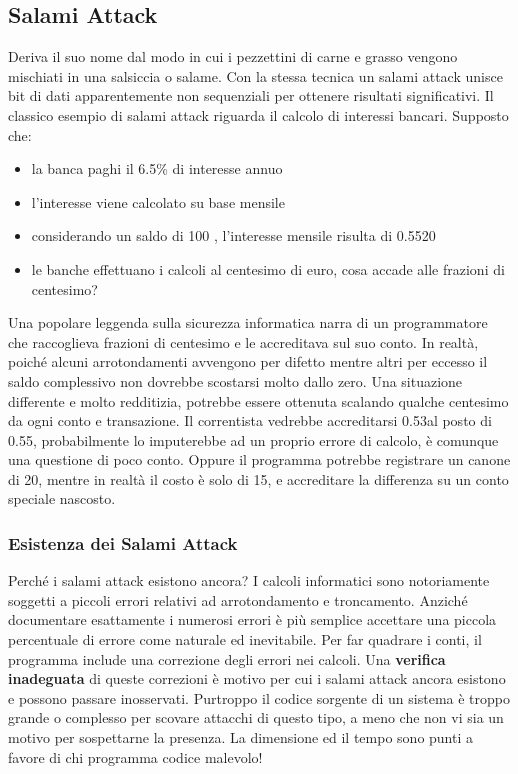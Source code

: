 \subsection{Salami Attack}
Deriva il suo nome dal modo in cui i pezzettini di carne e grasso vengono mischiati in una salsiccia o salame. Con la stessa tecnica un salami attack unisce bit di dati apparentemente non sequenziali per ottenere risultati significativi.
Il classico esempio di salami attack riguarda il calcolo di interessi bancari. Supposto che:
\begin{itemize}
	\item la banca paghi il 6.5\% di interesse annuo
	\item l'interesse viene calcolato su base mensile
	\item considerando un saldo di 100 \officialeuro, l'interesse mensile risulta di 0.5520 \officialeuro
	\item le banche effettuano i calcoli al centesimo di euro, cosa accade alle frazioni di centesimo?
\end{itemize}
Una popolare leggenda sulla sicurezza informatica narra di un programmatore che raccoglieva frazioni di centesimo e le accreditava sul suo conto.
In realtà, poiché alcuni arrotondamenti avvengono per difetto mentre altri per eccesso il saldo complessivo non dovrebbe scostarsi molto dallo zero.
\newline
Una situazione differente e molto redditizia, potrebbe essere ottenuta scalando qualche centesimo da ogni conto e transazione. Il correntista vedrebbe accreditarsi 0.53\officialeuro al posto di 0.55\officialeuro, probabilmente lo imputerebbe ad un proprio errore di calcolo, è comunque una questione di poco conto.
Oppure il programma potrebbe registrare un canone di 20\officialeuro, mentre in realtà il costo è solo di 15\officialeuro, e accreditare la differenza su un conto speciale nascosto.
\subsubsection{Esistenza dei Salami Attack}
Perché i salami attack esistono ancora? I calcoli informatici sono notoriamente soggetti a piccoli errori relativi ad arrotondamento e troncamento. Anziché documentare esattamente i numerosi errori è più semplice accettare una piccola percentuale di errore come naturale ed inevitabile. 
Per far quadrare i conti, il programma include una correzione degli errori nei calcoli. Una \textbf{verifica inadeguata} di queste correzioni è motivo per cui i salami attack ancora esistono e possono passare inosservati. 
Purtroppo il codice sorgente di un sistema è troppo grande o complesso per scovare attacchi di questo tipo, a meno che non vi sia un motivo per sospettarne la presenza. La dimensione ed il tempo sono punti a favore di chi programma codice malevolo!